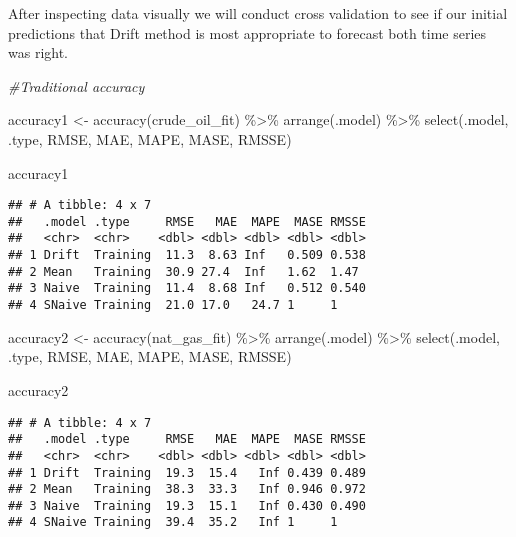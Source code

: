 \documentclass[
]{article}
\newenvironment{Shaded}{\begin{snugshade}}{\end{snugshade}}
\newcommand{\CommentTok}[1]{\textcolor[rgb]{0.56,0.35,0.01}{\textit{#1}}}
\newcommand{\FunctionTok}[1]{\textcolor[rgb]{0.00,0.00,0.00}{#1}}
\newcommand{\NormalTok}[1]{#1}
\newcommand{\OtherTok}[1]{\textcolor[rgb]{0.56,0.35,0.01}{#1}}
\newcommand{\SpecialCharTok}[1]{\textcolor[rgb]{0.00,0.00,0.00}{#1}}
\begin{document}
After inspecting data visually we will conduct cross validation to see
if our initial predictions that Drift method is most appropriate to
forecast both time series was right.

\begin{Shaded}
\begin{Highlighting}[]
\CommentTok{\#Traditional accuracy}


\NormalTok{accuracy1 }\OtherTok{\textless{}{-}} \FunctionTok{accuracy}\NormalTok{(crude\_oil\_fit) }\SpecialCharTok{\%\textgreater{}\%} 
  \FunctionTok{arrange}\NormalTok{(.model) }\SpecialCharTok{\%\textgreater{}\%} 
  \FunctionTok{select}\NormalTok{(.model, .type, RMSE, MAE, MAPE, MASE, RMSSE)}

\NormalTok{accuracy1}
\end{Highlighting}
\end{Shaded}

\begin{verbatim}
## # A tibble: 4 x 7
##   .model .type     RMSE   MAE  MAPE  MASE RMSSE
##   <chr>  <chr>    <dbl> <dbl> <dbl> <dbl> <dbl>
## 1 Drift  Training  11.3  8.63 Inf   0.509 0.538
## 2 Mean   Training  30.9 27.4  Inf   1.62  1.47 
## 3 Naive  Training  11.4  8.68 Inf   0.512 0.540
## 4 SNaive Training  21.0 17.0   24.7 1     1
\end{verbatim}

\begin{Shaded}
\begin{Highlighting}[]
\NormalTok{accuracy2 }\OtherTok{\textless{}{-}} \FunctionTok{accuracy}\NormalTok{(nat\_gas\_fit) }\SpecialCharTok{\%\textgreater{}\%} 
  \FunctionTok{arrange}\NormalTok{(.model) }\SpecialCharTok{\%\textgreater{}\%} 
  \FunctionTok{select}\NormalTok{(.model, .type, RMSE, MAE, MAPE, MASE, RMSSE)}

\NormalTok{accuracy2}
\end{Highlighting}
\end{Shaded}

\begin{verbatim}
## # A tibble: 4 x 7
##   .model .type     RMSE   MAE  MAPE  MASE RMSSE
##   <chr>  <chr>    <dbl> <dbl> <dbl> <dbl> <dbl>
## 1 Drift  Training  19.3  15.4   Inf 0.439 0.489
## 2 Mean   Training  38.3  33.3   Inf 0.946 0.972
## 3 Naive  Training  19.3  15.1   Inf 0.430 0.490
## 4 SNaive Training  39.4  35.2   Inf 1     1
\end{verbatim}
\end{document}
